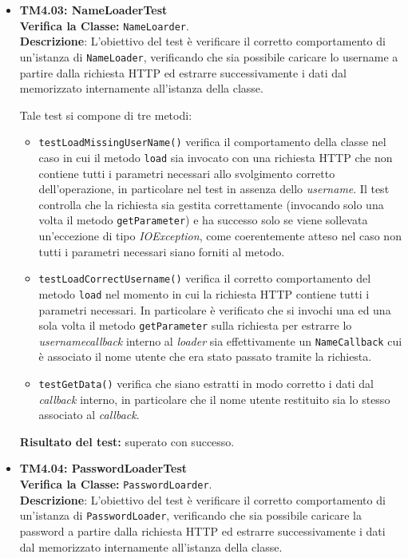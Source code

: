 \begin{itemize}
\item[\passed] \textbf{TM4.03: NameLoaderTest}\\
\textbf{Verifica la Classe:} \texttt{NameLoarder}.\\
\textbf{Descrizione}: L'obiettivo del test è verificare il corretto comportamento di un'istanza di \texttt{NameLoader}, verificando che sia possibile caricare lo username a partire dalla richiesta HTTP ed estrarre successivamente i dati dal  memorizzato internamente all'istanza della classe.

Tale test si compone di tre metodi:
\begin{itemize}

\item \texttt{testLoadMissingUserName()} verifica il comportamento della classe nel caso in cui il metodo \texttt{load} sia invocato con una richiesta HTTP che non contiene tutti i parametri necessari allo svolgimento corretto dell'operazione, in particolare nel test in assenza dello \textit{username}. Il test controlla che la richiesta sia gestita correttamente (invocando solo una volta il metodo \texttt{getParameter}) e ha successo solo se viene sollevata un'eccezione di tipo \textit{IOException}, come coerentemente atteso nel caso non tutti i parametri necessari siano forniti al metodo.

\item \texttt{testLoadCorrectUsername()} verifica il corretto comportamento del metodo \texttt{load} nel momento in cui la richiesta HTTP contiene tutti i parametri necessari. In particolare è verificato che si invochi una ed una sola volta il metodo \texttt{getParameter} sulla richiesta per estrarre lo \textit{username}\textit{callback} interno al \textit{loader} sia effettivamente un \texttt{NameCallback} cui è associato il nome utente che era stato passato tramite la richiesta.

\item \texttt{testGetData()} verifica che siano estratti in modo corretto i dati dal \textit{callback} interno, in particolare che il nome utente restituito sia lo stesso associato al \textit{callback}.

\end{itemize}
\textbf{Risultato del test:} superato con successo.

\item[\passed] \textbf{TM4.04: PasswordLoaderTest}\\
\textbf{Verifica la Classe:} \texttt{PasswordLoarder}.\\
\textbf{Descrizione}: L'obiettivo del test è verificare il corretto comportamento di un'istanza di \texttt{PasswordLoader}, verificando che sia possibile caricare la password a partire dalla richiesta HTTP ed estrarre successivamente i dati dal  memorizzato internamente all'istanza della classe.


\end{itemize}
